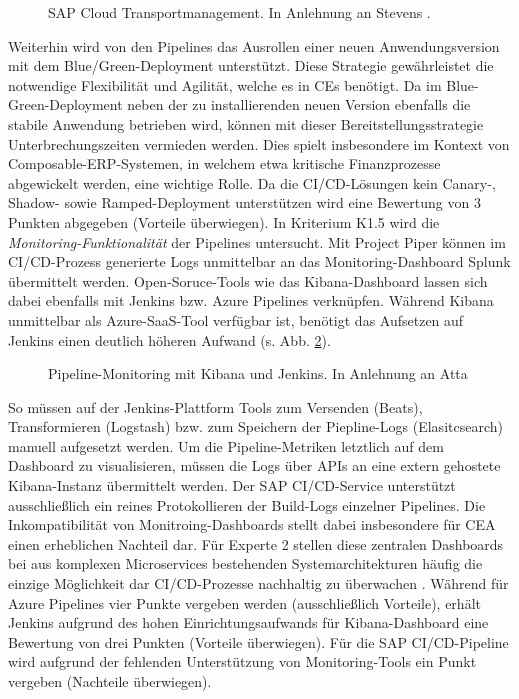 \begin{center}
	\begin{figure}[H]
		\centering
		\caption[SAP Cloud Transportmanagement]{SAP Cloud Transportmanagement. In Anlehnung an Stevens \cite{.20230327}.}
		\label{fig:CTM}
	\end{figure}
\end{center}
\vspace*{-10mm}
Weiterhin wird von den Pipelines das Ausrollen einer neuen Anwendungsversion mit dem Blue/Green-Deployment unterstützt. Diese Strategie gewährleistet die notwendige Flexibilität und Agilität, welche es in CEs benötigt. Da im Blue-Green-Deployment neben der zu installierenden neuen Version ebenfalls die stabile Anwendung betrieben wird, können mit dieser Bereitstellungsstrategie Unterbrechungszeiten vermieden werden. Dies spielt insbesondere im Kontext von Composable-ERP-Systemen, in welchem etwa kritische Finanzprozesse abgewickelt werden, eine wichtige Rolle. Da die CI/CD-Lösungen kein Canary-, Shadow- sowie Ramped-Deployment unterstützen wird eine Bewertung von 3 Punkten abgegeben (Vorteile überwiegen). In Kriterium K1.5 wird die \textit{Monitoring-Funktionalität} der Pipelines untersucht. Mit Project Piper können im CI/CD-Prozess generierte Logs unmittelbar an das Monitoring-Dashboard Splunk übermittelt werden. Open-Soruce-Tools wie das Kibana-Dashboard lassen sich dabei ebenfalls mit Jenkins bzw. Azure Pipelines verknüpfen. Während Kibana unmittelbar als Azure-SaaS-Tool verfügbar ist, benötigt das Aufsetzen auf Jenkins einen deutlich höheren Aufwand (s. Abb. \ref{fig:kibana}). 
\begin{center}
	\begin{figure}[H]
		\centering
		\caption[Pipeline-Monitoring mit Kibana und Jenkins]{Pipeline-Monitoring mit Kibana und Jenkins. In Anlehnung an Atta}
		\label{fig:kibana}
	\end{figure}
\end{center}
\vspace*{-15mm}
So müssen auf der Jenkins-Plattform Tools zum Versenden (Beats), Transformieren (Logstash) bzw. zum Speichern der Piepline-Logs (Elasitcsearch) manuell aufgesetzt werden. Um die Pipeline-Metriken letztlich auf dem Dashboard zu visualisieren, müssen die Logs über APIs an eine extern gehostete Kibana-Instanz übermittelt werden. Der SAP CI/CD-Service unterstützt ausschließlich ein reines Protokollieren der Build-Logs einzelner Pipelines. Die Inkompatibilität von Monitroing-Dashboards stellt dabei insbesondere für CEA einen erheblichen Nachteil dar. Für Experte 2 stellen diese zentralen Dashboards bei aus komplexen Microservices bestehenden Systemarchitekturen häufig die einzige Möglichkeit dar CI/CD-Prozesse nachhaltig zu überwachen \cite[Z. 39]{ProductManagerSAPHyperspaceCICD.}. Während für Azure Pipelines vier Punkte vergeben werden (ausschließlich Vorteile), erhält Jenkins aufgrund des hohen Einrichtungsaufwands für Kibana-Dashboard eine Bewertung von drei Punkten (Vorteile überwiegen). Für die SAP CI/CD-Pipeline wird aufgrund der fehlenden Unterstützung von Monitoring-Tools ein Punkt vergeben (Nachteile überwiegen).\\
